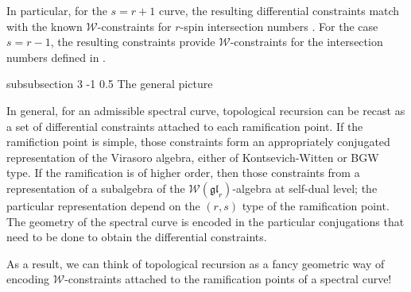 \documentclass[reqno,oneside,11pt]{amsart}
\makeatletter
\theoremstyle{plain}
\theoremstyle{definition}
\theoremstyle{remark}
\numberwithin{equation}{section}
\renewcommand{\subsubsection}{\@startsection
{subsubsection}%
{3}%
{\z@}%
{-1\baselineskip}%
{0.5\baselineskip}%
{\normalfont \it \normalsize}} %
\makeatother
\begin{document}
In particular, for the $s=r+1$ curve, the resulting differential constraints match with the known $\mathcal{W}$-constraints for $r$-spin intersection numbers . For the case $s=r-1$, the resulting constraints provide $\mathcal{W}$-constraints for the intersection numbers defined in \cite{CGG22} .


\subsubsection{The general picture}

In general, for an admissible spectral curve, topological recursion can be recast as a set of differential constraints attached to each ramification point. If the ramifiction point is simple, those constraints form an appropriately conjugated representation of the Virasoro algebra, either of Kontsevich-Witten or BGW type. If the ramification is of higher order, then those constraints from a representation of a subalgebra of the $\mathcal{W}(\mathfrak{gl}_r)$-algebra at self-dual level; the particular representation depend on the $(r,s)$ type of the ramification point. The geometry of the spectral curve is encoded in the particular conjugations that need to be done to obtain the differential constraints.

As a result, we can think of topological recursion as a fancy geometric way of encoding $\mathcal{W}$-constraints attached to the ramification points of a spectral curve! 
\end{document}
